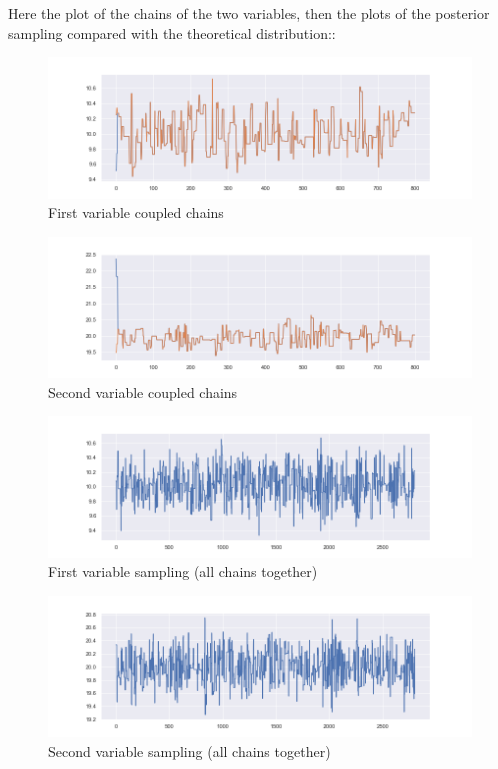 \documentclass[11pt,a4paper,oneside]{report}
\begin{document}
Here the plot of the chains of the two variables, then the plots of the posterior sampling compared with the theoretical distribution::
\begin{figure}[h!]
	\centering
	\includegraphics[width=\textwidth]{immagini_coupling_multivariate/coupling_mult_chain_meeeting_1}	
	\caption{First variable coupled chains}
\end{figure}

\begin{figure}[h!]
	\centering
	\includegraphics[width=\textwidth]{immagini_coupling_multivariate/coupling_mult_chain_meeeting_2}	
	\caption{Second variable coupled chains}
\end{figure}



\begin{figure}[h!]
	\centering
	\includegraphics[width=\textwidth]{immagini_coupling_multivariate/coupling_mult_sampling_1}	
	\caption{First variable sampling (all chains together)}
\end{figure}
\begin{figure}[h!]
	\centering
	\includegraphics[width=\textwidth]{immagini_coupling_multivariate/coupling_mult_sampling_2}	
	\caption{Second variable sampling (all chains together)}
\end{figure}
\end{document}
